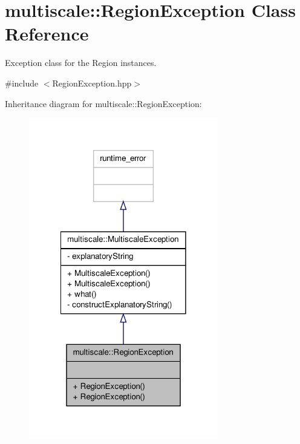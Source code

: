 \hypertarget{classmultiscale_1_1RegionException}{\section{multiscale\-:\-:Region\-Exception Class Reference}
\label{classmultiscale_1_1RegionException}
}


Exception class for the Region instances.  




{\ttfamily \#include $<$Region\-Exception.\-hpp$>$}



Inheritance diagram for multiscale\-:\-:Region\-Exception\-:
\nopagebreak
\begin{figure}[H]
\begin{center}
\leavevmode
\includegraphics[width=234pt]{classmultiscale_1_1RegionException__inherit__graph}
\end{center}
\end{figure}


